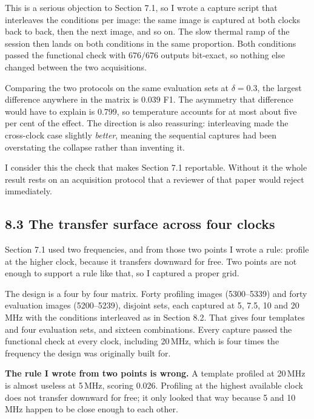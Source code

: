 \documentclass[11pt,a4paper]{article}
\begin{document}
This is a serious objection to Section 7.1, so I wrote a capture script that interleaves
the conditions per image: the same image is captured at both clocks back to back, then the
next image, and so on. The slow thermal ramp of the session then lands on both conditions
in the same proportion. Both conditions passed the functional check with $676/676$ outputs
bit-exact, so nothing else changed between the two acquisitions.

Comparing the two protocols on the same evaluation sets at $\delta = 0.3$, the largest
difference anywhere in the matrix is $0.039$ F1. The asymmetry that difference would have
to explain is $0.799$, so temperature accounts for at most about five per cent of the
effect. The direction is also reassuring: interleaving made the cross-clock case slightly
\emph{better}, meaning the sequential captures had been overstating the collapse rather
than inventing it.

I consider this the check that makes Section 7.1 reportable. Without it the whole result
rests on an acquisition protocol that a reviewer of that paper would reject immediately.

\subsection*{8.3 The transfer surface across four clocks}

Section 7.1 used two frequencies, and from those two points I wrote a rule: profile at the
higher clock, because it transfers downward for free. Two points are not enough to support
a rule like that, so I captured a proper grid.

The design is a four by four matrix. Forty profiling images (5300--5339) and forty
evaluation images (5200--5239), disjoint sets, each captured at 5, 7.5, 10 and 20\,MHz
with the conditions interleaved as in Section 8.2. That gives four templates and four
evaluation sets, and sixteen combinations. Every capture passed the functional check at
every clock, including 20\,MHz, which is four times the frequency the design was
originally built for.

\begin{table}[h]
  \centering
  \small
  
  \caption{Foreground F1 for every combination of profiling and attack clock, at a fixed
  $\delta = 0.25$. The matched-condition diagonal is in italics.}
  \label{tab:grid}
\end{table}

\textbf{The rule I wrote from two points is wrong.} A template profiled at 20\,MHz is
almost useless at 5\,MHz, scoring $0.026$. Profiling at the highest available clock does
not transfer downward for free; it only looked that way because 5 and 10\,MHz happen to be
close enough to each other.
\end{document}
